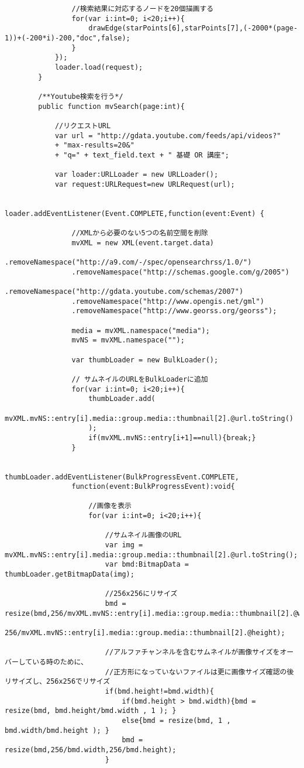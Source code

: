 {\begin{verbatim}
				//検索結果に対応するノードを20個描画する
				for(var i:int=0; i<20;i++){
					drawEdge(starPoints[6],starPoints[7],(-2000*(page-1))+(-200*i)-200,"doc",false);
				}
			});
			loader.load(request);
		}
		
		/**Youtube検索を行う*/
		public function mvSearch(page:int){
			
			//リクエストURL
			var url = "http://gdata.youtube.com/feeds/api/videos?"
			+ "max-results=20&"
			+ "q=" + text_field.text + " 基礎 OR 講座";
			
			var loader:URLLoader = new URLLoader();
			var request:URLRequest=new URLRequest(url);
			
			loader.addEventListener(Event.COMPLETE,function(event:Event) {
									
				//XMLから必要のない5つの名前空間を削除
				mvXML = new XML(event.target.data)
				.removeNamespace("http://a9.com/-/spec/opensearchrss/1.0/")
				.removeNamespace("http://schemas.google.com/g/2005")
				.removeNamespace("http://gdata.youtube.com/schemas/2007")
				.removeNamespace("http://www.opengis.net/gml")
				.removeNamespace("http://www.georss.org/georss");
				
				media = mvXML.namespace("media");
				mvNS = mvXML.namespace("");
				
				var thumbLoader = new BulkLoader();
				
				// サムネイルのURLをBulkLoaderに追加
				for(var i:int=0; i<20;i++){
					thumbLoader.add(
						mvXML.mvNS::entry[i].media::group.media::thumbnail[2].@url.toString()
					);
					if(mvXML.mvNS::entry[i+1]==null){break;}
				}
				
				thumbLoader.addEventListener(BulkProgressEvent.COMPLETE,
				function(event:BulkProgressEvent):void{
					
					//画像を表示
					for(var i:int=0; i<20;i++){
						
						//サムネイル画像のURL
						var img = mvXML.mvNS::entry[i].media::group.media::thumbnail[2].@url.toString();
						var bmd:BitmapData = thumbLoader.getBitmapData(img);
						
						//256x256にリサイズ
						bmd = resize(bmd,256/mvXML.mvNS::entry[i].media::group.media::thumbnail[2].@width,
									 	 256/mvXML.mvNS::entry[i].media::group.media::thumbnail[2].@height);
									 
						//アルファチャンネルを含むサムネイルが画像サイズをオーバーしている時のために、
						//正方形になっていないファイルは更に画像サイズ確認の後リサイズし、256x256でリサイズ
						if(bmd.height!=bmd.width){
							if(bmd.height > bmd.width){bmd = resize(bmd, bmd.height/bmd.width , 1 ); }
							else{bmd = resize(bmd, 1 , bmd.width/bmd.height ); }
							bmd = resize(bmd,256/bmd.width,256/bmd.height);
						}
						

\end{verbatim}}
